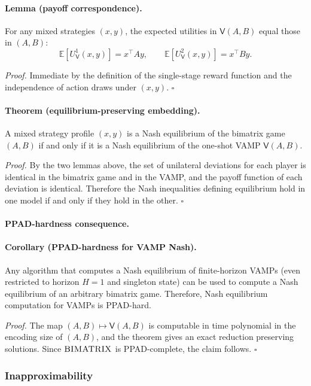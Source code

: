 \paragraph{Lemma (payoff correspondence).}
For any mixed strategies \((x,y)\), the expected utilities in \(\mathsf V(A,B)\) equal those in \((A,B)\):
\[
\mathbb E[U^1_{\mathsf V}(x,y)] = x^\top A y,\qquad
\mathbb E[U^2_{\mathsf V}(x,y)] = x^\top B y.
\]

\emph{Proof.} Immediate by the definition of the single-stage reward function and the independence of action draws under \((x,y)\). \(\square\)

\paragraph{Theorem (equilibrium-preserving embedding).}
A mixed strategy profile \((x,y)\) is a Nash equilibrium of the bimatrix game \((A,B)\) if and only if it is a Nash equilibrium of the one-shot VAMP \(\mathsf V(A,B)\).

\emph{Proof.} By the two lemmas above, the set of unilateral deviations for each player is identical in the bimatrix game and in the VAMP, and the payoff function of each deviation is identical. Therefore the Nash inequalities defining equilibrium hold in one model if and only if they hold in the other. \(\square\)

\paragraph{PPAD-hardness consequence.}

\paragraph{Corollary (PPAD-hardness for VAMP Nash).}
Any algorithm that computes a Nash equilibrium of finite-horizon VAMPs (even restricted to horizon \(H=1\) and singleton state) can be used to compute a Nash equilibrium of an arbitrary bimatrix game. Therefore, Nash equilibrium computation for VAMPs is PPAD-hard.

\emph{Proof.} The map \((A,B)\mapsto \mathsf V(A,B)\) is computable in time polynomial in the encoding size of \((A,B)\), and the theorem gives an exact reduction preserving solutions. Since \(\textsc{BIMATRIX}\) is PPAD-complete, the claim follows. \(\square\)

\subsubsection{Inapproximability}

